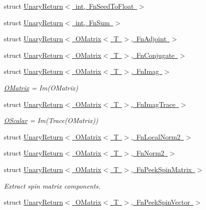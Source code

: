 \begin{DoxyCompactItemize}
\item 
struct \mbox{\hyperlink{structENSEM_1_1UnaryReturn_3_01int_00_01FnSeedToFloat_01_4}{Unary\+Return$<$ int, Fn\+Seed\+To\+Float $>$}}
\item 
struct \mbox{\hyperlink{structENSEM_1_1UnaryReturn_3_01int_00_01FnSum_01_4}{Unary\+Return$<$ int, Fn\+Sum $>$}}
\item 
struct \mbox{\hyperlink{structENSEM_1_1UnaryReturn_3_01OMatrix_3_01T_01_4_00_01FnAdjoint_01_4}{Unary\+Return$<$ O\+Matrix$<$ T $>$, Fn\+Adjoint $>$}}
\item 
struct \mbox{\hyperlink{structENSEM_1_1UnaryReturn_3_01OMatrix_3_01T_01_4_00_01FnConjugate_01_4}{Unary\+Return$<$ O\+Matrix$<$ T $>$, Fn\+Conjugate $>$}}
\item 
struct \mbox{\hyperlink{structENSEM_1_1UnaryReturn_3_01OMatrix_3_01T_01_4_00_01FnImag_01_4}{Unary\+Return$<$ O\+Matrix$<$ T $>$, Fn\+Imag $>$}}
\begin{DoxyCompactList}\small\item\em \mbox{\hyperlink{classENSEM_1_1OMatrix}{O\+Matrix}} = Im(\+O\+Matrix) \end{DoxyCompactList}\item 
struct \mbox{\hyperlink{structENSEM_1_1UnaryReturn_3_01OMatrix_3_01T_01_4_00_01FnImagTrace_01_4}{Unary\+Return$<$ O\+Matrix$<$ T $>$, Fn\+Imag\+Trace $>$}}
\begin{DoxyCompactList}\small\item\em \mbox{\hyperlink{classENSEM_1_1OScalar}{O\+Scalar}} = Im(\+Trace(\+O\+Matrix)) \end{DoxyCompactList}\item 
struct \mbox{\hyperlink{structENSEM_1_1UnaryReturn_3_01OMatrix_3_01T_01_4_00_01FnLocalNorm2_01_4}{Unary\+Return$<$ O\+Matrix$<$ T $>$, Fn\+Local\+Norm2 $>$}}
\item 
struct \mbox{\hyperlink{structENSEM_1_1UnaryReturn_3_01OMatrix_3_01T_01_4_00_01FnNorm2_01_4}{Unary\+Return$<$ O\+Matrix$<$ T $>$, Fn\+Norm2 $>$}}
\item 
struct \mbox{\hyperlink{structENSEM_1_1UnaryReturn_3_01OMatrix_3_01T_01_4_00_01FnPeekSpinMatrix_01_4}{Unary\+Return$<$ O\+Matrix$<$ T $>$, Fn\+Peek\+Spin\+Matrix $>$}}
\begin{DoxyCompactList}\small\item\em Extract spin matrix components. \end{DoxyCompactList}\item 
struct \mbox{\hyperlink{structENSEM_1_1UnaryReturn_3_01OMatrix_3_01T_01_4_00_01FnPeekSpinVector_01_4}{Unary\+Return$<$ O\+Matrix$<$ T $>$, Fn\+Peek\+Spin\+Vector $>$}}

\end{DoxyCompactItemize}
